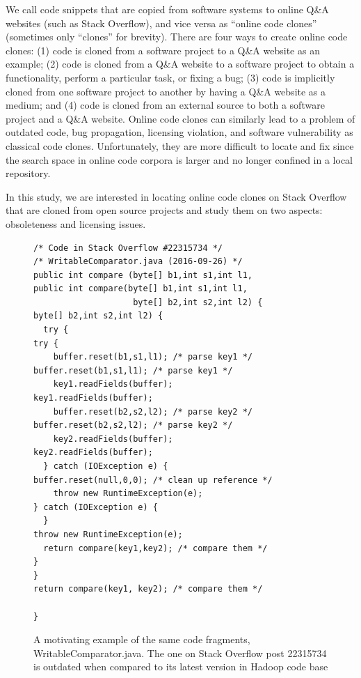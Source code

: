 \documentclass{sig-alternate-05-2015}
\begin{document}

We call code snippets that are copied from software systems to online Q\&A websites (such as Stack Overflow), and vice versa as ``online code clones'' (sometimes only ``clones'' for brevity). There are four ways to create online code clones: (1) code is cloned from a software project to a Q\&A website as an example; (2) code is cloned from a Q\&A website to a software project to obtain a functionality, perform a particular task, or fixing a bug; (3) code is implicitly cloned from one software project to another by having a Q\&A website as a medium; and (4) code is cloned from an external source to both a software project and a Q\&A website. Online code clones can similarly lead to a problem of outdated code, bug propagation, licensing violation, and software vulnerability as classical code clones. Unfortunately, they are more difficult to locate and fix since the search space in online code corpora is larger and no longer confined in a local repository. 

In this study, we are interested in locating online code clones on Stack Overflow that are cloned from open source projects and study them on two aspects: obsoleteness and licensing issues. 

\begin{figure}
	\begin{lstlisting}
/* Code in Stack Overflow #22315734 */                    /* WritableComparator.java (2016-09-26) */
public int compare (byte[] b1,int s1,int l1,              public int compare(byte[] b1,int s1,int l1,
                    byte[] b2,int s2,int l2) {                               byte[] b2,int s2,int l2) {
  try {                                                     try {
    buffer.reset(b1,s1,l1); /* parse key1 */                  buffer.reset(b1,s1,l1); /* parse key1 */
    key1.readFields(buffer);                                  key1.readFields(buffer);
    buffer.reset(b2,s2,l2); /* parse key2 */                  buffer.reset(b2,s2,l2); /* parse key2 */
    key2.readFields(buffer);                                  key2.readFields(buffer);
  } catch (IOException e) {                                   buffer.reset(null,0,0); /* clean up reference */
    throw new RuntimeException(e);                          } catch (IOException e) {
  }                                                           throw new RuntimeException(e);
  return compare(key1,key2); /* compare them */             }
}                                                           return compare(key1, key2); /* compare them */
	                                                        }
	\end{lstlisting}
	\caption{A motivating example of the same code fragments, WritableComparator.java. The one on Stack Overflow post 22315734 is outdated when compared to its latest version in Hadoop code base}
	\label{fig:before-after}
\end{figure}
\end{document}
